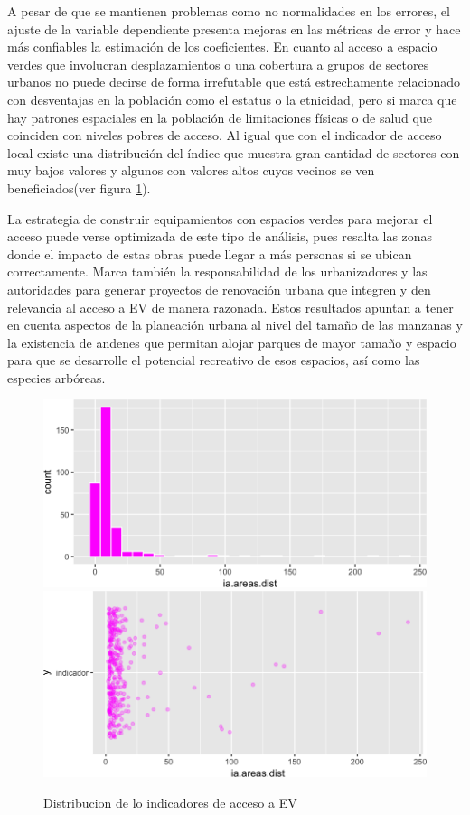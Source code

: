 \documentclass[12pt,]{book}
\begin{document}
A pesar de que se mantienen problemas como no normalidades en los
errores, el ajuste de la variable dependiente presenta mejoras en las
métricas de error y hace más confiables la estimación de los
coeficientes. En cuanto al acceso a espacio verdes que involucran
desplazamientos o una cobertura a grupos de sectores urbanos no puede
decirse de forma irrefutable que está estrechamente relacionado con
desventajas en la población como el estatus o la etnicidad, pero si
marca que hay patrones espaciales en la población de limitaciones
físicas o de salud que coinciden con niveles pobres de acceso. Al igual
que con el indicador de acceso local existe una distribución del índice
que muestra gran cantidad de sectores con muy bajos valores y algunos
con valores altos cuyos vecinos se ven beneficiados(ver figura
\ref{fig:hist-areasdist}).

La estrategia de construir equipamientos con espacios verdes para
mejorar el acceso puede verse optimizada de este tipo de análisis, pues
resalta las zonas donde el impacto de estas obras puede llegar a más
personas si se ubican correctamente. Marca también la responsabilidad de
los urbanizadores y las autoridades para generar proyectos de renovación
urbana que integren y den relevancia al acceso a EV de manera razonada.
Estos resultados apuntan a tener en cuenta aspectos de la planeación
urbana al nivel del tamaño de las manzanas y la existencia de andenes
que permitan alojar parques de mayor tamaño y espacio para que se
desarrolle el potencial recreativo de esos espacios, así como las
especies arbóreas.

\begin{figure}
\includegraphics[width=1\linewidth]{tesis-unigis_files/figure-latex/hist-areasdist-1} \includegraphics[width=1\linewidth]{tesis-unigis_files/figure-latex/hist-areasdist-2} \caption{Distribucion de lo indicadores de acceso a EV }\label{fig:hist-areasdist}
\end{figure}
\end{document}
